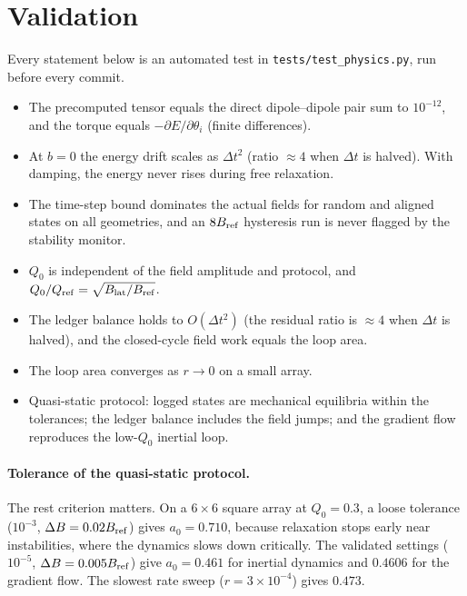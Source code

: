 \documentclass[11pt,a4paper]{article}
\newcommand{\code}[1]{\texttt{#1}}
\begin{document}
\section{Validation}
\label{sec:validation}

Every statement below is an automated test in \code{tests/test\_physics.py}, run before every commit.

\begin{itemize}[leftmargin=*]
\item The precomputed tensor equals the direct dipole--dipole pair sum to $10^{-12}$, and the torque equals $-\partial E/\partial\theta_i$ (finite differences).
\item At $b=0$ the energy drift scales as $\Delta t^2$ (ratio $\approx4$ when $\Delta t$ is halved). With damping, the energy never rises during free relaxation.
\item The time-step bound dominates the actual fields for random and aligned states on all geometries, and an $8B_{\rm ref}$ hysteresis run is never flagged by the stability monitor.
\item $Q_0$ is independent of the field amplitude and protocol, and $Q_0/Q_{\rm ref}=\sqrt{B_{\rm lat}/B_{\rm ref}}$.
\item The ledger balance holds to $O(\Delta t^2)$ (the residual ratio is $\approx4$ when $\Delta t$ is halved), and the closed-cycle field work equals the loop area.
\item The loop area converges as $r\to0$ on a small array.
\item Quasi-static protocol: logged states are mechanical equilibria within the tolerances; the ledger balance includes the field jumps; and the gradient flow reproduces the low-$Q_0$ inertial loop.
\end{itemize}

\paragraph{Tolerance of the quasi-static protocol.} The rest criterion matters. On a $6\times6$ square array at $Q_0=0.3$, a loose tolerance ($10^{-3}$, $\Delta B=0.02B_{\rm ref}$) gives $a_0=0.710$, because relaxation stops early near instabilities, where the dynamics slows down critically. The validated settings ($10^{-5}$, $\Delta B=0.005B_{\rm ref}$) give $a_0=0.461$ for inertial dynamics and $0.4606$ for the gradient flow. The slowest rate sweep ($r=3\times10^{-4}$) gives $0.473$. 
\end{document}
